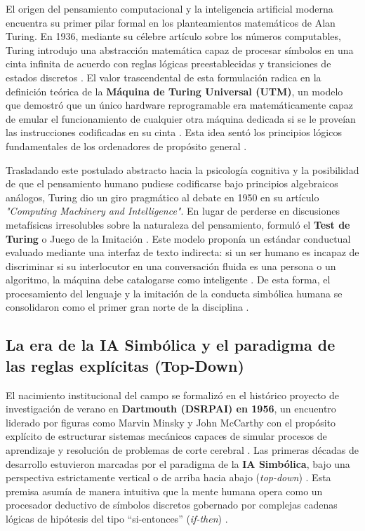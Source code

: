 \documentclass[12pt, a4paper]{article}
\begin{document}
El origen del pensamiento computacional y la inteligencia artificial moderna encuentra su primer pilar formal en los planteamientos matemáticos de Alan Turing. En 1936, mediante su célebre artículo sobre los números computables, Turing introdujo una abstracción matemática capaz de procesar símbolos en una cinta infinita de acuerdo con reglas lógicas preestablecidas y transiciones de estados discretos \parencite{zhang2023turing}. El valor trascendental de esta formulación radica en la definición teórica de la \textbf{Máquina de Turing Universal (UTM)}, un modelo que demostró que un único hardware reprogramable era matemáticamente capaz de emular el funcionamiento de cualquier otra máquina dedicada si se le proveían las instrucciones codificadas en su cinta \parencite{zhang2023turing}. Esta idea sentó los principios lógicos fundamentales de los ordenadores de propósito general \parencite{zhang2023turing}.

Trasladando este postulado abstracto hacia la psicología cognitiva y la posibilidad de que el pensamiento humano pudiese codificarse bajo principios algebraicos análogos, Turing dio un giro pragmático al debate en 1950 en su artículo \textit{"Computing Machinery and Intelligence"}. En lugar de perderse en discusiones metafísicas irresolubles sobre la naturaleza del pensamiento, formuló el \textbf{Test de Turing} o Juego de la Imitación \parencite{haenlein2019brief, zhang2023turing}. Este modelo proponía un estándar conductual evaluado mediante una interfaz de texto indirecta: si un ser humano es incapaz de discriminar si su interlocutor en una conversación fluida es una persona o un algoritmo, la máquina debe catalogarse como inteligente \parencite{haenlein2019brief}. De esta forma, el procesamiento del lenguaje y la imitación de la conducta simbólica humana se consolidaron como el primer gran norte de la disciplina \parencite{haenlein2019brief}.

\subsection{La era de la IA Simbólica y el paradigma de las reglas explícitas (Top-Down)}

El nacimiento institucional del campo se formalizó en el histórico proyecto de investigación de verano en \textbf{Dartmouth (DSRPAI) en 1956}, un encuentro liderado por figuras como Marvin Minsky y John McCarthy con el propósito explícito de estructurar sistemas mecánicos capaces de simular procesos de aprendizaje y resolución de problemas de corte cerebral \parencite{haenlein2019brief, buchanan2005very}. Las primeras décadas de desarrollo estuvieron marcadas por el paradigma de la \textbf{IA Simbólica}, bajo una perspectiva estrictamente vertical o de arriba hacia abajo (\textit{top-down}) \parencite{haenlein2019brief}. Esta premisa asumía de manera intuitiva que la mente humana opera como un procesador deductivo de símbolos discretos gobernado por complejas cadenas lógicas de hipótesis del tipo ``si-entonces'' (\textit{if-then}) \parencite{haenlein2019brief}.
\end{document}
